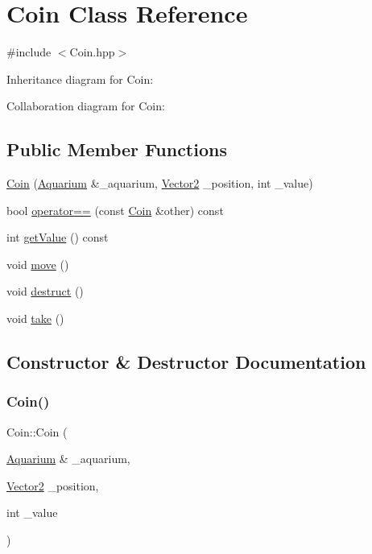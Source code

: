 \hypertarget{class_coin}{}\section{Coin Class Reference}
\label{class_coin}


{\ttfamily \#include $<$Coin.\+hpp$>$}



Inheritance diagram for Coin\+:


Collaboration diagram for Coin\+:
\subsection*{Public Member Functions}
\begin{DoxyCompactItemize}
\item 
\mbox{\hyperlink{class_coin_a5aa05323e2dab5f755e283d66ef1aae8}{Coin}} (\mbox{\hyperlink{class_aquarium}{Aquarium}} \&\+\_\+aquarium, \mbox{\hyperlink{struct_vector2}{Vector2}} \+\_\+position, int \+\_\+value)
\item 
bool \mbox{\hyperlink{class_coin_a803072934a3da4010352955208e14c4e}{operator==}} (const \mbox{\hyperlink{class_coin}{Coin}} \&other) const
\item 
int \mbox{\hyperlink{class_coin_a53c8bf65afdde1422cfda51d753d74b7}{get\+Value}} () const
\item 
void \mbox{\hyperlink{class_coin_ab62bca5834489b9b483deaa3ca3470e9}{move}} ()
\item 
void \mbox{\hyperlink{class_coin_a16c42ef0d21f50bb08d4099d82b4ed57}{destruct}} ()
\item 
void \mbox{\hyperlink{class_coin_abdc8520a89656c688cc70cffa14265ca}{take}} ()
\end{DoxyCompactItemize}


\subsection{Constructor \& Destructor Documentation}
\mbox{\label{class_coin_a5aa05323e2dab5f755e283d66ef1aae8}} 
\subsubsection{\texorpdfstring{Coin()}{Coin()}}
{\footnotesize\ttfamily Coin\+::\+Coin (\begin{DoxyParamCaption}\item[{\mbox{\hyperlink{class_aquarium}{Aquarium}} \&}]{\+\_\+aquarium,  }\item[{\mbox{\hyperlink{struct_vector2}{Vector2}}}]{\+\_\+position,  }\item[{int}]{\+\_\+value }\end{DoxyParamCaption})}



